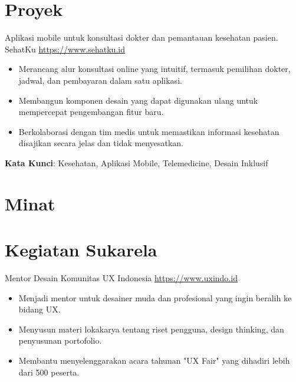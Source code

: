 \documentclass[a4paper, serif, 10pt]{moderncv}
\begin{document}
\section{Proyek}

        {Aplikasi mobile untuk konsultasi dokter dan pemantauan kesehatan pasien.}
        {SehatKu}
        {\url{https://www.sehatku.id}}
        {}
        {\begin{itemize}
\item Merancang alur konsultasi online yang intuitif, termasuk pemilihan dokter, jadwal, dan pembayaran dalam satu aplikasi.
\item Membangun komponen desain yang dapat digunakan ulang untuk mempercepat pengembangan fitur baru.
\item Berkolaborasi dengan tim medis untuk memastikan informasi kesehatan disajikan secara jelas dan tidak menyesatkan.
\end{itemize}
\textbf{Kata Kunci}: Kesehatan, Aplikasi Mobile, Telemedicine, Desain Inklusif}
\section{Minat}

\section{Kegiatan Sukarela}

        {Mentor Desain}
        {Komunitas UX Indonesia}
        {\url{https://www.uxindo.id}}
        {}
        {\begin{itemize}
\item Menjadi mentor untuk desainer muda dan profesional yang ingin beralih ke bidang UX.
\item Menyusun materi lokakarya tentang riset pengguna, design thinking, dan penyusunan portofolio.
\item Membantu menyelenggarakan acara tahunan "UX Fair" yang dihadiri lebih dari 500 peserta.
\end{itemize}}
    
\end{document}
